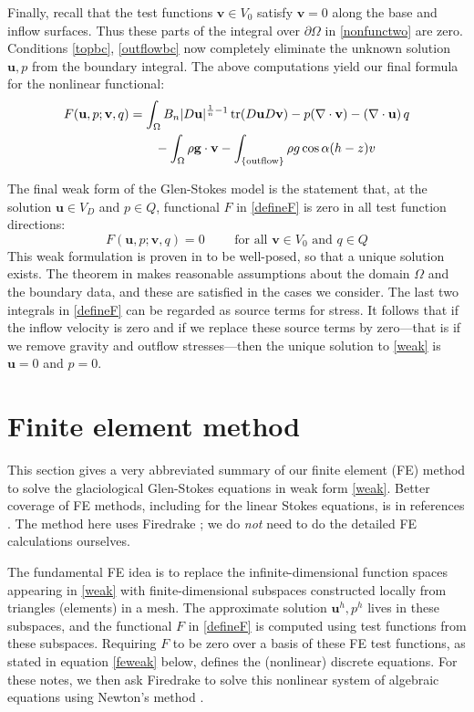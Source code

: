 \documentclass[letterpaper,final,12pt,reqno]{amsart}
\newcommand{\trace}{\operatorname{tr}}
\newcommand{\bu}{\mathbf{u}}
\newcommand{\bv}{\mathbf{v}}
\begin{document}
Finally, recall that the test functions $\bv\in V_0$ satisfy $\bv=0$ along the base and inflow surfaces.  Thus these parts of the integral over $\partial\Omega$ in \eqref{nonfunctwo} are zero.  Conditions \eqref{topbc}, \eqref{outflowbc} now completely eliminate the unknown solution $\bu,p$ from the boundary integral.  The above computations yield our final formula for the nonlinear functional:
\begin{align}
F(\bu,p;\bv,q) &= \int_\Omega B_n |D\bu|^{\frac{1}{n} - 1} \trace(D\bu D\bv) - p (\nabla \cdot \bv) - \left(\nabla \cdot \bu\right) q \label{defineF} \\
    &\qquad  - \int_\Omega \rho \mathbf{g} \cdot \bv - \int_{\{\text{outflow}\}} \rho g \cos\alpha (h-z) v  \notag
\end{align}

The final weak form of the Glen-Stokes model is the statement that, at the solution $\bu\in V_D$ and $p\in Q$, functional $F$ in \eqref{defineF} is zero in all test function directions:
\begin{equation}
F(\bu,p;\bv,q) = 0 \qquad \text{ for all } \bv\in V_0 \text{ and } q\in Q  \label{weak}
\end{equation}
This weak formulation is proven in \cite[Theorem 3.8]{JouvetRappaz2011} to be well-posed, so that a unique solution exists.  The theorem in \cite{JouvetRappaz2011} makes reasonable assumptions about the domain $\Omega$ and the boundary data, and these are satisfied in the cases we consider.  The last two integrals in \eqref{defineF} can be regarded as source terms for stress.  It follows that if the inflow velocity is zero and if we replace these source terms by zero---that is if we remove gravity and outflow stresses---then the unique solution to \eqref{weak} is $\bu=0$ and $p=0$.


\section{Finite element method} \label{sec:femethod}

This section gives a very abbreviated summary of our finite element (FE) method to solve the glaciological Glen-Stokes equations in weak form \eqref{weak}.  Better coverage of FE methods, including for the linear Stokes equations, is in references \cite{Braess2007,Bueler2021,Elmanetal2014}.  The method here uses Firedrake \cite{Rathgeberetal2016}; we do \emph{not} need to do the detailed FE calculations ourselves.

The fundamental FE idea is to replace the infinite-dimensional function spaces appearing in \eqref{weak} with finite-dimensional subspaces constructed locally from triangles (elements) in a mesh.  The approximate solution $\bu^h,p^h$ lives in these subspaces, and the functional $F$ in \eqref{defineF} is computed using test functions from these subspaces.  Requiring $F$ to be zero over a basis of these FE test functions, as stated in equation \eqref{feweak} below, defines the (nonlinear) discrete equations.  For these notes, we then ask Firedrake to solve this nonlinear system of algebraic equations using Newton's method \cite{Bueler2021}.
\end{document}
